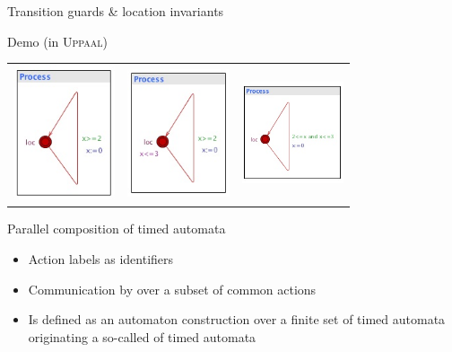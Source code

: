 \documentclass[aspectratio=169]{beamer}
\def\uppaal{\textsc{Uppaal}}
\begin{document}
\begin{slide}{Transition guards \& location invariants}
\small

\begin{block}{Demo (in  \uppaal)}
~\\


\begin{tabular}{ccc}
  \includegraphics[width=3cm]{./images/g1.jpg} & \includegraphics[width=3cm]{./images/g2.jpg} &  \includegraphics[width=3cm]{./images/g3.jpg}
\end{tabular}

\end{block}
\end{slide}


\begin{slide}{Parallel composition of timed automata}
\small

\begin{itemize}
\item Action labels as  identifiers
\item Communication by  over a subset of common actions
\item  Is defined as an automaton construction over a finite set of
  timed automata originating a so-called  of timed
  automata
\end{itemize}

\end{slide}
\end{document}
